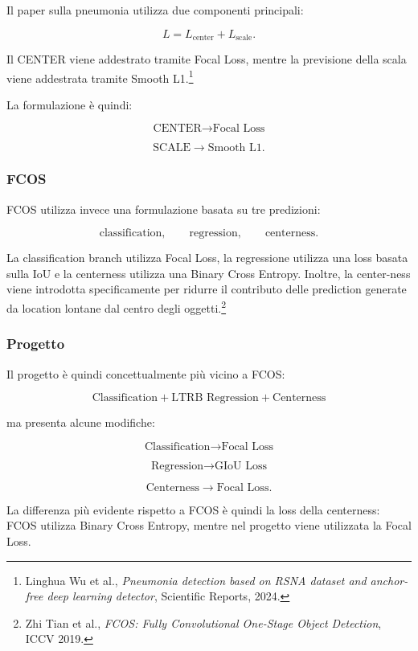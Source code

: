 Il paper sulla pneumonia utilizza due componenti principali:

\[
L =
L_{\text{center}}
+
L_{\text{scale}}.
\]

Il CENTER viene addestrato tramite Focal Loss, mentre la previsione della scala
viene addestrata tramite Smooth L1.\footnote{Linghua Wu et al.,
\textit{Pneumonia detection based on RSNA dataset and anchor-free deep learning
detector}, Scientific Reports, 2024.}

La formulazione è quindi:

\[
\text{CENTER}
\rightarrow
\text{Focal Loss}
\]

\[
\text{SCALE}
\rightarrow
\text{Smooth L1}.
\]

\subsubsection{FCOS}

FCOS utilizza invece una formulazione basata su tre predizioni:

\[
\text{classification},
\qquad
\text{regression},
\qquad
\text{centerness}.
\]

La classification branch utilizza Focal Loss, la regressione utilizza una
loss basata sulla IoU e la centerness utilizza una Binary Cross Entropy.
Inoltre, la center-ness viene introdotta specificamente per ridurre il
contributo delle prediction generate da location lontane dal centro degli
oggetti.\footnote{Zhi Tian et al., \textit{FCOS: Fully Convolutional One-Stage
Object Detection}, ICCV 2019.}

\subsubsection{Progetto}

Il progetto è quindi concettualmente più vicino a FCOS:

\[
\boxed{
\text{Classification}
+
\text{LTRB Regression}
+
\text{Centerness}
}
\]

ma presenta alcune modifiche:

\[
\text{Classification}
\rightarrow
\text{Focal Loss}
\]

\[
\text{Regression}
\rightarrow
\text{GIoU Loss}
\]

\[
\text{Centerness}
\rightarrow
\text{Focal Loss}.
\]

La differenza più evidente rispetto a FCOS è quindi la loss della
centerness: FCOS utilizza Binary Cross Entropy, mentre nel progetto viene
utilizzata la Focal Loss.

